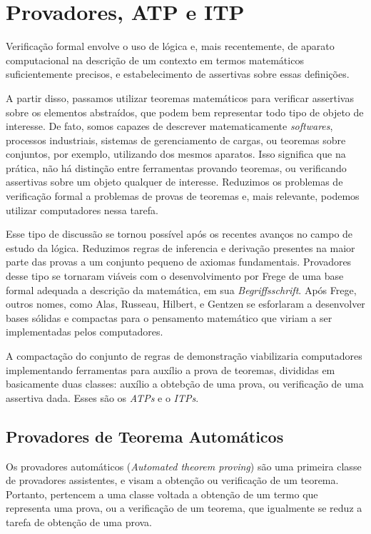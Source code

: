 \section{Provadores, ATP e ITP}

Verificação formal envolve o uso de lógica e, mais recentemente, de aparato computacional na descrição de um contexto em termos matemáticos suficientemente precisos, e estabelecimento de assertivas sobre essas definições.

A partir disso, passamos utilizar teoremas matemáticos para verificar assertivas sobre os elementos abstraídos, que podem bem representar todo tipo de objeto de interesse.
De fato, somos capazes de descrever matematicamente \textit{softwares}, processos industriais, sistemas de gerenciamento de cargas, ou teoremas sobre conjuntos, por exemplo, utilizando dos mesmos aparatos.
Isso significa que na prática, não há distinção entre ferramentas provando teoremas, ou verificando assertivas sobre um objeto qualquer de interesse.
Reduzimos os problemas de verificação formal a problemas de provas de teoremas e, mais relevante, podemos utilizar computadores nessa tarefa.

Esse tipo de discussão se tornou possível após os recentes avanços no campo de estudo da lógica.
Reduzimos regras de inferencia e derivação presentes na maior parte das provas a um conjunto pequeno de axiomas fundamentais.
Provadores desse tipo se tornaram viáveis com o desenvolvimento por Frege de uma base formal adequada a descrição da matemática, em sua \textit{Begriffsschrift}.
Após Frege, outros nomes, como Alas, Russeau, Hilbert, e Gentzen se esforlaram a desenvolver bases sólidas e compactas para o pensamento matemático que viriam a ser implementadas pelos computadores.

A compactação do conjunto de regras de demonstração viabilizaria computadores implementando ferramentas para auxílio a prova de teoremas, divididas em basicamente duas classes: auxílio a obtebção de uma prova, ou verificação de uma assertiva dada. Esses são os \textit{ATPs} e o \textit{ITPs}.

\subsection{Provadores de Teorema Automáticos}
Os provadores automáticos (\textit{Automated theorem proving}) são uma primeira classe de provadores assistentes, e visam a obtenção ou verificação de um teorema.
Portanto, pertencem a uma classe voltada a obtenção de um termo que representa uma prova, ou a verificação de um teorema, que igualmente se reduz a tarefa de obtenção de uma prova.

